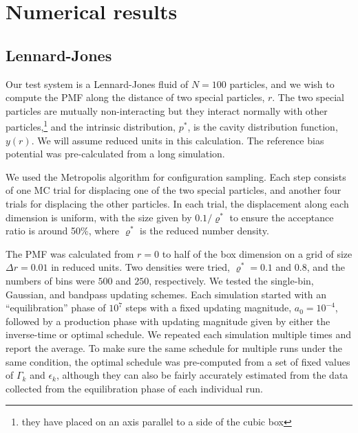 \documentclass[reprint, superscriptaddress, floatfix]{revtex4-1}
\begin{document}
%
%




\section{\label{sec:results}
Numerical results}



\subsection{\label{sec:lj}Lennard-Jones}


Our test system is a Lennard-Jones fluid of $N=100$ particles,
and we wish to compute the PMF along the distance of two special particles, $r$.
%
The two special particles are mutually non-interacting
but they interact normally with other particles,\footnote{they
have placed on an axis parallel to a side of the cubic box}
and the intrinsic distribution, $p^*$, is
the cavity distribution function, $y(r)$\cite{hansen}.
%
We will assume reduced units in this calculation.
%
The reference bias potential was pre-calculated from a long simulation.

We used the Metropolis algorithm for configuration sampling\cite{frenkel}.
%
Each step consists of
one MC trial for displacing one of the two special particles,
and another four trials for displacing the other particles.
%
In each trial, the displacement along each dimension is uniform,
with the size given by $0.1/\varrho^*$ to ensure the acceptance ratio is around 50\%,
where $\varrho^*$ is the reduced number density.


The PMF was calculated from $r = 0$ to half of the box dimension
on a grid of size $\Delta r = 0.01$ in reduced units.
%
Two densities were tried, $\varrho^* = 0.1$ and $0.8$,
and the numbers of bins were $500$ and $250$, respectively.
%
We tested the single-bin, Gaussian, and bandpass updating schemes.
%
Each simulation started with an ``equilibration'' phase
of $10^7$ steps with a fixed updating magnitude, $a_0 = 10^{-4}$,
followed by a production phase
with updating magnitude given by
either the inverse-time or optimal schedule.
%
We repeated each simulation multiple times
and report the average.
%
To make sure the same schedule for multiple runs under the same condition,
the optimal schedule was pre-computed from a set of fixed values of
$\Gamma_k$ and $\epsilon_k$,
although they can also be fairly accurately estimated from the data
collected from the equilibration phase of each individual run.
\end{document}
